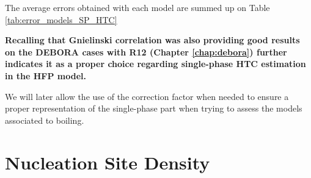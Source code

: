 \npar
The average errors obtained with each model are summed up on Table \ref{tab:error_models_SP_HTC}

\begin{table}[h!]


\noindent{}
\caption{Average errors achieved by the considered models on each data sets.}
\label{tab:error_models_SP_HTC}
\end{table}


\npar
\textbf{Recalling that Gnielinski correlation was also providing good results on the DEBORA cases with R12 (Chapter \ref{chap:debora}) further indicates it as a proper choice regarding single-phase HTC estimation in the HFP model.} 

\npar
\begin{note*}{}
We will later allow the use of the correction factor when needed to ensure a proper representation of the single-phase part when trying to assess the models associated to boiling.
\end{note*}



\section{Nucleation Site Density}
\label{sec:NSD}

